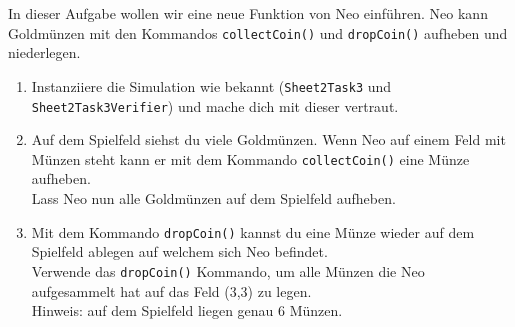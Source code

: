 

In dieser Aufgabe wollen wir eine neue Funktion von Neo einführen.
Neo kann Goldmünzen mit den Kommandos \lstinline{collectCoin()} und \lstinline{dropCoin()} aufheben und niederlegen.

\begin{enumerate}
    \item Instanziiere die Simulation wie bekannt (\lstinline{Sheet2Task3} und \lstinline{Sheet2Task3Verifier}) und mache dich mit dieser vertraut.
    \item Auf dem Spielfeld siehst du viele Goldmünzen.
        Wenn Neo auf einem Feld mit Münzen steht kann er mit dem Kommando \lstinline{collectCoin()} eine Münze aufheben.\\
        Lass Neo nun alle Goldmünzen auf dem Spielfeld aufheben.
    \item Mit dem Kommando \lstinline{dropCoin()} kannst du eine Münze wieder auf dem Spielfeld ablegen auf welchem sich Neo befindet.\\
        Verwende das \lstinline{dropCoin()} Kommando, um alle Münzen die Neo aufgesammelt hat auf das Feld (3,3) zu legen.\\
        Hinweis: auf dem Spielfeld liegen genau 6 Münzen.
\end{enumerate}


